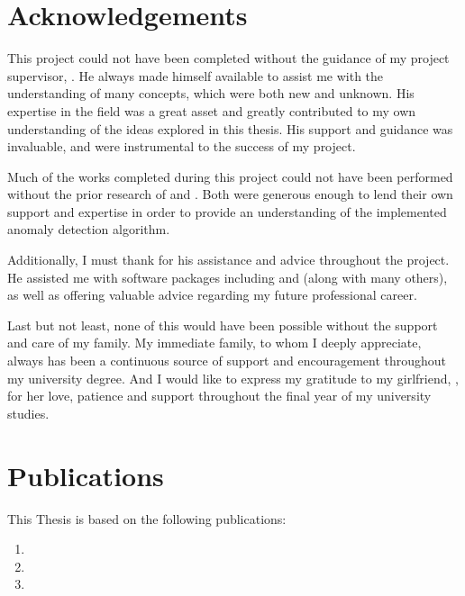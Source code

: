 \documentclass[a4paper]{report}
\begin{document}
\chapter*{Acknowledgements}
\label{acknowledgements}
This project could not have been completed without the guidance of my project
supervisor, \supervisorName{}. He always made himself available to assist me
with the understanding of many concepts, which were both new and unknown. His
expertise in the field was a great asset and greatly contributed to my own
understanding of the ideas explored in this thesis. His support and guidance was
invaluable, and were instrumental to the success of my project.

Much of the works completed during this project could not have been performed
without the prior research of  and . Both were
generous enough to lend their own support and expertise in order to provide an
understanding of the implemented anomaly detection algorithm.

Additionally, I must thank  for his assistance and advice
throughout the project. He assisted me with software packages including
 and
 (along with many
others), as well as offering valuable advice regarding my future professional
career.

Last but not least, none of this would have been possible without the support
and care of my family. My immediate family, to whom I deeply appreciate, always
has been a continuous source of support and encouragement throughout my
university degree. And I would like to express my gratitude to my girlfriend,
, for her love, patience and support throughout the final
year of my university studies.

\clearpage
{}
\chapter*{Publications}
\label{publications}
This Thesis is based on the following publications:
\begin{enumerate}
    \item {}
    \item {}
    \item {}
\end{enumerate}
\end{document}
